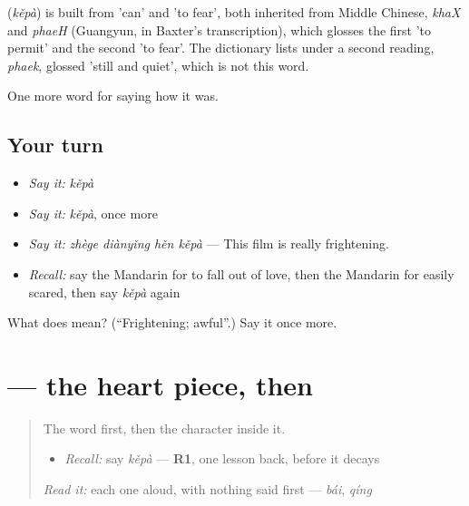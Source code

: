 \begin{cousinweb}
\textbf{} (\emph{kěpà}) is built from  'can' and  'to fear', both inherited from Middle Chinese, \emph{khaX} and \emph{phaeH} (Guangyun, in Baxter's transcription), which glosses the first 'to permit' and the second 'to fear'. The dictionary lists  under a second reading, \emph{phaek}, glossed 'still and quiet', which is not this word.
\end{cousinweb}

\begin{grammarlens}[title={What you've built}]
One more word for saying how it was.
\end{grammarlens}

\subsection*{Your turn}
\begin{itemize}
\raggedright
  \item \emph{Say it:} \emph{kěpà}
  \item \emph{Say it:} \emph{kěpà}, once more
  \item \emph{Say it:} \emph{zhège diànyǐng hěn kěpà} — This film is really frightening.
  \item \emph{Recall:} say the Mandarin for to fall out of love, then the Mandarin for easily scared, then say \emph{kěpà} again
\end{itemize}

\begin{tcolorbox}[breakable,colback=teal!4,colframe=teal!35!black,title={Before you move on}]
What does  mean? (\textquotedblleft{}Frightening; awful\textquotedblright{}.) Say it once more.
\end{tcolorbox}
\section[\texorpdfstring{\zh{怕} (pà)}{怕 (pà)}]{ — the heart piece, then }

\label{lesson:ZH-W463-pa-fear}



\begin{quote}
The word first, then the character inside it.

\begin{itemize}
\raggedright
  \item \emph{Recall:} say \emph{kěpà} — \textbf{R1}, one lesson back, before it decays
\end{itemize}

\begin{quote}
 
\end{quote}

\emph{Read it:} each one aloud, with nothing said first — \emph{bái}, \emph{qíng}
\end{quote}

